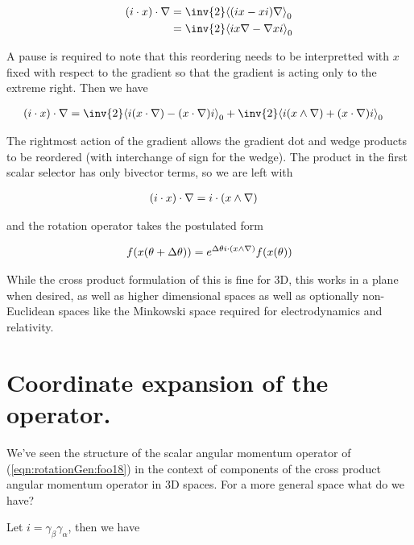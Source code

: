 \begin{align*}
( i \cdot x) \cdot \grad
&=
\inv{2} \gpgradezero{ ( i x - x i) \grad } \\
&=
\inv{2} \gpgradezero{ i x \grad - \grad x i } \\
\end{align*}

A pause is required to note that this reordering needs to be interpretted with $x$ fixed with respect to the gradient so that the gradient is acting only to the extreme right.  Then we have

\begin{align}\label{eqn:rotationGen:foo17}
( i \cdot x) \cdot \grad
&=
\inv{2} \gpgradezero{ i (x \cdot \grad) - (x \cdot \grad) i } + \inv{2} \gpgradezero{ i (x \wedge \grad) + (x \cdot \grad) i } 
\end{align}

The rightmost action of the gradient allows the gradient dot and wedge products to be reordered (with interchange of sign for the wedge).  The product in the first scalar selector has only bivector terms, so we are left with

\begin{align}\label{eqn:rotationGen:foo18}
( i \cdot x) \cdot \nabla
&=
i \cdot (x \wedge \nabla)
\end{align}

and the rotation operator takes the postulated form

\begin{align}\label{eqn:rotationGen:foo19}
f(x(\theta + \Delta\theta)) = e^{\Delta\theta i \cdot (x \wedge \nabla)} f(x(\theta))
\end{align}

While the cross product formulation of this is fine for 3D, this works in a plane when desired, as well as higher dimensional spaces as well as optionally non-Euclidean spaces like the Minkowski space required for electrodynamics and relativity.

\section{Coordinate expansion of the operator.}

We've seen the structure of the scalar angular momentum operator of (\ref{eqn:rotationGen:foo18}) in the context of components of the cross product angular momentum operator in 3D spaces.  For a more general space what do we have?

Let $i = \gamma_\beta \gamma_\alpha$, then we have

